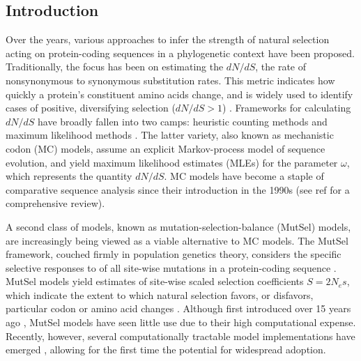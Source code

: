 \documentclass{pnastwo}
\begin{document}
\begin{article}

\section*{Introduction}

Over the years, various approaches to infer the strength of natural selection acting on protein-coding sequences in a phylogenetic context have been proposed. Traditionally, the focus has been on estimating the $dN/dS$, the rate of nonsynonymous to synonymous substitution rates. This metric indicates how quickly a protein's constituent amino acids change, and is widely used to identify cases of positive, diversifying selection ($dN/dS > 1$) \cite{NielsenYang1998, Yangetal2000, KosakovskyPondFrost2005b, Huelsenbecketal2006}. 
Frameworks for calculating $dN/dS$ have broadly fallen into two camps: heuristic counting methods \cite{LWL85,NG86,Pamilo1993,Ina1995,YN00} and maximum likelihood methods \cite{GoldmanYang1994,MuseGaut1994,NielsenYang1998,Yang2006}. The latter variety, also known as mechanistic codon (MC) models, assume an explicit Markov-process model of sequence evolution, and yield maximum likelihood estimates (MLEs) for the parameter $\omega$, which represents the quantity $dN/dS$. MC models have become a staple of comparative sequence analysis since their introduction in the 1990s (see ref \cite{Anisimova2009} for a comprehensive review).

A second class of models, known as mutation-selection-balance (MutSel) models, are increasingly being viewed as a viable alternative to MC models. The MutSel framework, couched firmly in population genetics theory, considers the specific selective responses to of all site-wise mutations in a protein-coding sequence \cite{HalpernBruno1998,Thorne2012}. MutSel models yield estimates of site-wise scaled selection coefficients $S=2N_es$, which indicate the extent to which natural selection favors, or disfavors, particular codon or amino acid changes \cite{HalpernBruno1998,YangNielsen2008,Rodrigueetal2010,Tamurietal2012}. Although first introduced over 15 years ago \cite{HalpernBruno1998}, MutSel models have seen little use due to their high computational expense. Recently, however, several computationally tractable model implementations have emerged \cite{RodrigueLartillot2014,Tamurietal2014}, allowing for the first time the potential for widespread adoption. 


\end{article}
\end{document}
